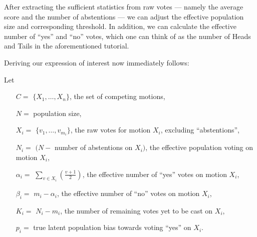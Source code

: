 \documentclass{sigchi}
\begin{document}
After extracting the sufficient statistics from raw votes --- namely the average score and the number of
abstentions --- we can adjust the effective population size and corresponding threshold.
In addition, we can calculate the effective number of ``yes'' and ``no'' votes, which one can think of as the number
of Heads and Tails in the aforementioned tutorial.

Deriving our expression of interest now immediately follows:

Let
\begin{description}
\begin{itemize}
\item[$C = $] $\{X_1,\ldots, X_n\}$, the set of competing motions,
\item[$N = $] population size,
\item[$X_i = $] $\{v_1, \ldots, v_{m_i}\}$, the raw votes for motion $X_i$, excluding ``abstentions'',
\item[$N_i = $] $(N - $ number of abstentions on $X_i)$, the effective population voting on motion $X_i$,
\item[$\alpha_i = $] $\sum\limits_{v \in X_i} (\frac{v+1}{2})$, the effective number of ``yes'' votes on motion $X_i$,
\item[$\beta_i = $] $m_i - \alpha_i$, the effective number of ``no'' votes on motion $X_i$,
\item[$K_i = $] $N_i - m_i$, the number of remaining votes yet to be cast on $X_i$,
\item[$p_i = $] true latent population bias towards voting ``yes'' on $X_i$.
\end{itemize}
\end{description}
\end{document}
